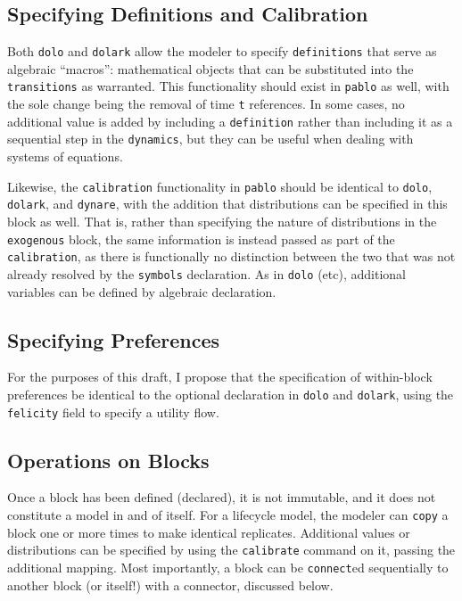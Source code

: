 \documentclass[12pt,pdftex,letterpaper]{article}
\begin{document}
\subsection{Specifying Definitions and Calibration}

Both \texttt{dolo} and \texttt{dolark} allow the modeler to specify \texttt{definitions} that serve as algebraic ``macros'': mathematical objects that can be substituted into the \texttt{transitions} as warranted. This functionality should exist in \texttt{pablo} as well, with the sole change being the removal of time \texttt{t} references. In some cases, no additional value is added by including a \texttt{definition} rather than including it as a sequential step in the \texttt{dynamics}, but they can be useful when dealing with systems of equations.

Likewise, the \texttt{calibration} functionality in \texttt{pablo} should be identical to \texttt{dolo}, \texttt{dolark}, and \texttt{dynare}, with the addition that distributions can be specified in this block as well. That is, rather than specifying the nature of distributions in the \texttt{exogenous} block, the same information is instead passed as part of the \texttt{calibration}, as there is functionally no distinction between the two that was not already resolved by the \texttt{symbols} declaration. As in \texttt{dolo} (etc), additional variables can be defined by algebraic declaration.


\subsection{Specifying Preferences}

For the purposes of this draft, I propose that the specification of within-block preferences be identical to the optional declaration in \texttt{dolo} and \texttt{dolark}, using the \texttt{felicity} field to specify a utility flow.


\subsection{Operations on Blocks}

Once a block has been defined (declared), it is not immutable, and it does not constitute a model in and of itself. For a lifecycle model, the modeler can \texttt{copy} a block one or more times to make identical replicates. Additional values or distributions can be specified by using the \texttt{calibrate} command on it, passing the additional mapping. Most importantly, a block can be \texttt{connect}ed sequentially to another block (or itself!) with a connector, discussed below.
\end{document}
